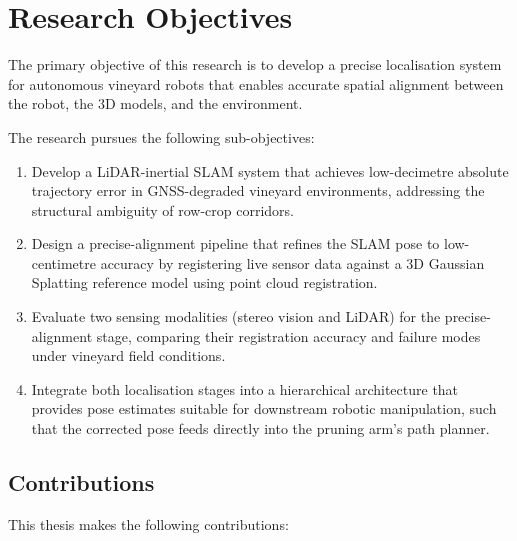 \section{Research Objectives}
\label{sec:research-objectives}

The primary objective of this research is to develop a precise localisation system for autonomous vineyard robots that enables accurate spatial alignment between the robot, the 3D models, and the environment.

The research pursues the following sub-objectives:

\begin{enumerate}

    \item Develop a LiDAR-inertial SLAM system that achieves low-decimetre absolute trajectory error in GNSS-degraded vineyard environments, addressing the structural ambiguity of row-crop corridors.

    \item Design a precise-alignment pipeline that refines the SLAM pose to low-centimetre accuracy by registering live sensor data against a 3D Gaussian Splatting reference model using point cloud registration.

    \item Evaluate two sensing modalities (stereo vision and LiDAR) for the precise-alignment stage, comparing their registration accuracy and failure modes under vineyard field conditions.

    \item Integrate both localisation stages into a hierarchical architecture that provides pose estimates suitable for downstream robotic manipulation, such that the corrected pose feeds directly into the pruning arm's path planner.

\end{enumerate}

\subsection{Contributions}
\label{subsec:contributions}

This thesis makes the following contributions:

